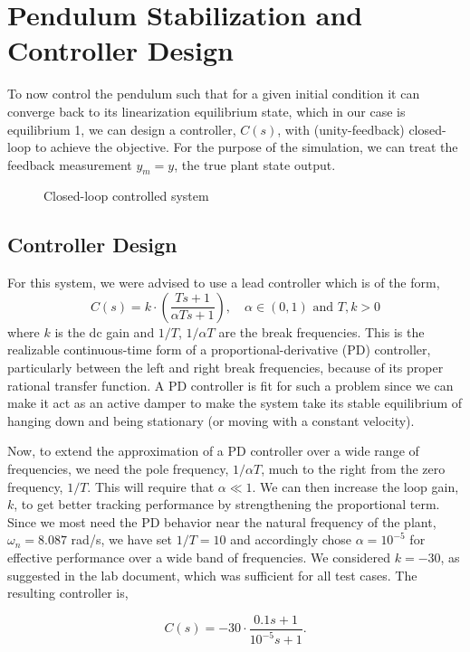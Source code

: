 \documentclass[10pt]{article}
\begin{document}
\section{Pendulum Stabilization and Controller Design}
To now control the pendulum such that for a given initial condition it can converge back to its linearization equilibrium state, which in our case is equilibrium 1, we can design a controller, $C(s)$, with (unity-feedback) closed-loop to achieve the objective. For the purpose of the simulation, we can treat the feedback measurement $y_m = y$, the true plant state output.

\begin{figure}[!h]
    \centering
    \mixedcls
    \caption{Closed-loop controlled system}
\end{figure}

\subsection{Controller Design}
For this system, we were advised to use a lead controller which is of the form, 
\[ C(s) = k\cdot\left(\frac{Ts + 1}{\alpha Ts + 1}\right), \quad \alpha \in (0,1) \text{ and } T,k > 0\]
where $k$ is the dc gain and $1/T$, $1/\alpha T$ are the break frequencies. This is the realizable continuous-time form of a proportional-derivative (PD) controller, particularly between the left and right break frequencies, because of its proper rational transfer function. A PD controller is fit for such a problem since we can make it act as an active damper to make the system take its stable equilibrium of hanging down and being stationary (or moving with a constant velocity).

Now, to extend the approximation of a PD controller over a wide range of frequencies, we need the pole frequency, $1/\alpha T$, much to the right from the zero frequency, $1/T$. This will require that $\alpha \ll 1$. We can then increase the loop gain, $k$, to get better tracking performance by strengthening the proportional term. Since we most need the PD behavior near the natural frequency of the plant, $\omega_n = 8.087$ rad/s, we have set $1/T = 10$ and accordingly chose $\alpha=10^{-5}$ for effective performance over a wide band of frequencies. We considered $k = -30$, as suggested in the lab document, which was sufficient for all test cases. The resulting controller is,

\begin{equation*}
    C(s) = -30\cdot\frac{0.1s+1}{10^{-5}s+1}.
\end{equation*}
\end{document}
